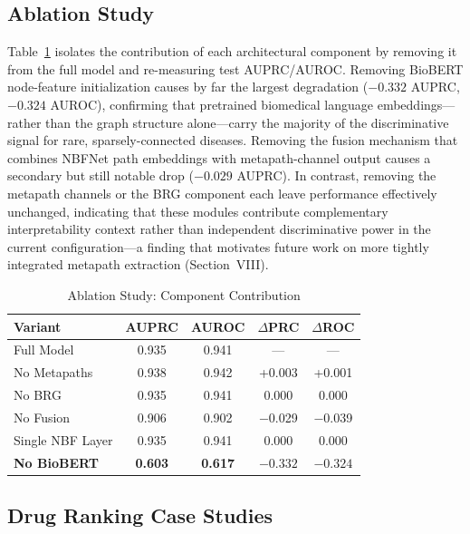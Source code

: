 \documentclass[conference]{IEEEtran}
\begin{document}
\subsection{Ablation Study}

Table~\ref{tab:ablation} isolates the contribution of each architectural component by removing it from the full model and re-measuring test AUPRC/AUROC. Removing BioBERT node-feature initialization causes by far the largest degradation ($-0.332$ AUPRC, $-0.324$ AUROC), confirming that pretrained biomedical language embeddings---rather than the graph structure alone---carry the majority of the discriminative signal for rare, sparsely-connected diseases. Removing the fusion mechanism that combines NBFNet path embeddings with metapath-channel output causes a secondary but still notable drop ($-0.029$ AUPRC). In contrast, removing the metapath channels or the BRG component each leave performance effectively unchanged, indicating that these modules contribute complementary interpretability context rather than independent discriminative power in the current configuration---a finding that motivates future work on more tightly integrated metapath extraction (Section~VIII).

\begin{table}[!t]
\caption{Ablation Study: Component Contribution}
\label{tab:ablation}
\centering
\footnotesize
\renewcommand{\arraystretch}{1.4}
\begin{tabular}{p{2.5cm}cccc}
\toprule
\textbf{Variant} & \textbf{AUPRC} & \textbf{AUROC} & $\Delta$\textbf{PRC} & $\Delta$\textbf{ROC} \\
\midrule
Full Model & 0.935 & 0.941 & --- & --- \\
No Metapaths & 0.938 & 0.942 & +0.003 & +0.001 \\
No BRG & 0.935 & 0.941 & 0.000 & 0.000 \\
No Fusion & 0.906 & 0.902 & $-$0.029 & $-$0.039 \\
Single NBF Layer & 0.935 & 0.941 & 0.000 & 0.000 \\
\textbf{No BioBERT} & \textbf{0.603} & \textbf{0.617} & $\mathbf{-0.332}$ & $\mathbf{-0.324}$ \\
\bottomrule
\end{tabular}
\end{table}

\subsection{Drug Ranking Case Studies}
\end{document}
